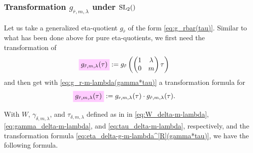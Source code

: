 \documentclass{article}
\begin{document}
\subsubsection{Transformation $g_{\bar{r},m,\lambda}$ under $\SL2Z$}

Let us take a generalized eta-quotient $g_{\bar{r}}$ of the form
\eqref{eq:g_rbar(tau)}.
Similar to what has been done above for pure eta-quotients, we first
need the transformation of
\begin{align}
  \defineNotation[g-rtilde-m-lambda-tau]{g_{\tilde{r},m,\lambda}(\tau)}
  &:=
  g_{\tilde{r}}
    \left(
    \begin{pmatrix}1&\lambda\\0&m\end{pmatrix}\tau
    \right)
  \label{eq:g_rtilde-m-lambda(tau)}
\end{align}
and then get with \eqref{eq:g_r-m-lambda(gamma*tau)} a transformation
formula for
\begin{align}
  \defineNotation[g-rbar-m-lambda-tau]{g_{\bar{r},m,\lambda}(\tau)}
  &:=
    g_{r,m,\lambda}(\tau)
    \cdot
    g_{\tilde{r},m,\lambda}(\tau).
  \label{eq:g_rbar-m-lambda(tau)}
\end{align}



With $W$, $\gamma_{\delta,m,\lambda}$, and $\tau_{\delta,m,\lambda}$
defined as in in \eqref{eq:W_delta-m-lambda},
\eqref{eq:gamma_delta-m-lambda}, and \eqref{eq:tau_delta-m-lambda},
respectively, and the transformation formula
\eqref{eq:eta_delta-g-m-lambda^[R](gamma*tau)}, we have the following
formula.
\end{document}
